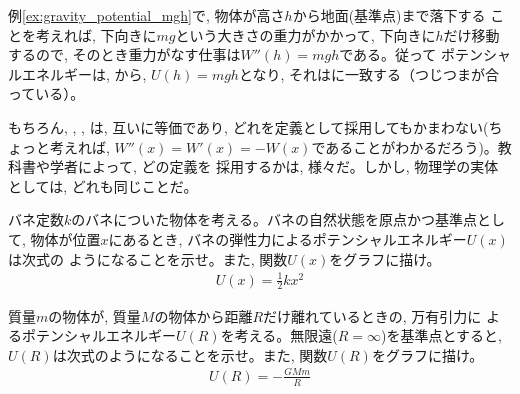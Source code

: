 例\ref{ex:gravity_potential_mgh}で, 物体が高さ$h$から地面(基準点)まで落下する
ことを考えれば, 下向きに$mg$という大きさの重力がかかって, 下向きに$h$だけ移動
するので, そのとき重力がなす仕事は$W''(h)=mgh$である。従って
ポテンシャルエネルギーは, から, $U(h)=mgh$となり, 
それはに一致する（つじつまが合っている）。

もちろん, , , 
は, 互いに等価であり, どれを定義として採用してもかまわない(ちょっと考えれば, 
$W''(x)=W'(x)=-W(x)$であることがわかるだろう)。教科書や学者によって, どの定義を
採用するかは, 様々だ。しかし, 物理学の実体としては, どれも同じことだ。\mv

\begin{q}\label{q:potential_spring}
バネ定数$k$のバネについた物体を考える。バネの自然状態を原点かつ基準点として, 
物体が位置$x$にあるとき, バネの弾性力によるポテンシャルエネルギー$U(x)$は次式の
ようになることを示せ。また, 関数$U(x)$をグラフに描け。
\begin{eqnarray}
U(x)=\frac{1}{2}kx^2\label{eq:potential_spring}
\end{eqnarray}
\end{q}
\mv

\begin{q}\label{q:potential_gravity}
質量$m$の物体が, 質量$M$の物体から距離$R$だけ離れているときの, 万有引力に
よるポテンシャルエネルギー$U(R)$を考える。無限遠($R=\infty$)を基準点とすると, 
$U(R)$は次式のようになることを示せ。また, 関数$U(R)$をグラフに描け。
\begin{eqnarray}
U(R)=-\frac{GMm}{R}\label{eq:potential_gravity}
\end{eqnarray}
\end{q}
\mv

